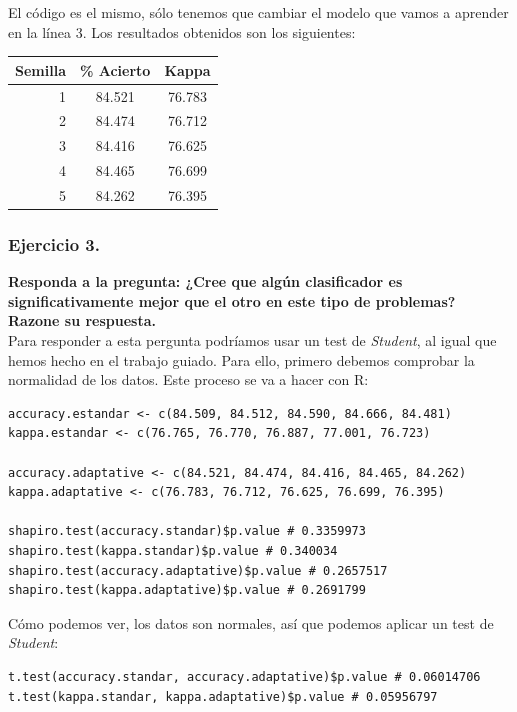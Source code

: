 \documentclass[11pt]{article}
\begin{document}
El código es el mismo, sólo tenemos que cambiar el modelo que vamos a aprender en la línea 3. Los resultados obtenidos son los siguientes:

\begin{table}[H]
	\centering
	\begin{tabular}{rcc}
		\textbf{Semilla} & \textbf{\% Acierto} & \textbf{Kappa} \\ \hline
		1 & 84.521 & 76.783 \\
		2 & 84.474 & 76.712 \\
		3 & 84.416 & 76.625 \\
		4 & 84.465 & 76.699 \\
		5 & 84.262 & 76.395
	\end{tabular}
\end{table}

\subsubsection{Ejercicio 3.}

\textbf{Responda a la pregunta: ¿Cree que algún clasificador es significativamente mejor que el otro en este tipo de problemas? Razone su respuesta.} \\

Para responder a esta pergunta podríamos usar un test de \textit{Student}, al igual que hemos hecho en el trabajo guiado. Para ello, primero debemos comprobar la normalidad de los datos. Este proceso se va a hacer con R:

\begin{lstlisting}
accuracy.estandar <- c(84.509, 84.512, 84.590, 84.666, 84.481)
kappa.estandar <- c(76.765, 76.770, 76.887, 77.001, 76.723)

accuracy.adaptative <- c(84.521, 84.474, 84.416, 84.465, 84.262)
kappa.adaptative <- c(76.783, 76.712, 76.625, 76.699, 76.395)

shapiro.test(accuracy.standar)$p.value # 0.3359973
shapiro.test(kappa.standar)$p.value # 0.340034
shapiro.test(accuracy.adaptative)$p.value # 0.2657517
shapiro.test(kappa.adaptative)$p.value # 0.2691799
\end{lstlisting}

Cómo podemos ver, los datos son normales, así que podemos aplicar un test de \textit{Student}:

\begin{lstlisting}
t.test(accuracy.standar, accuracy.adaptative)$p.value # 0.06014706
t.test(kappa.standar, kappa.adaptative)$p.value # 0.05956797
\end{lstlisting}
\end{document}
